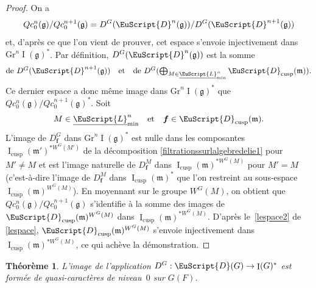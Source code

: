 \documentclass[JEP,XML,SOM,Unicode,francais]{cedram}
\let\mathcal \EuScript
\newcommand{\quadet}{\quad\text{et}\quad}
\newcommand{\frg}{\mathfrak{g}}
\newcommand{\mfrm}{\mathfrak{m}}
\newcommand{\cusp}{\mathrm{cusp}}
\newcommand{\Gr}{\mathrm{Gr}}
\DeclareMathOperator{\rI}{I}
\newcommand{\bmf}{\boldsymbol{f}}
\newcommand{\cD}{\mathcal{D}}
\newcommand{\cL}{\mathcal{L}}
\theoremstyle{plain}
\newtheorem*{thm*}{Théorème}
\theoremstyle{definition}
\begin{document}
\begin{proof}
On a
\[
Qc_{0}^n(\frg)/Qc_{0}^{n+1}(\frg)=D^G(\cD^n(\frg))/D^G(\cD^{n+1}(\frg))
\]
et, d'après ce que l'on vient de prouver, cet espace s'envoie injectivement dans $\Gr^n\rI(\frg)^*$.
Par définition, $D^G(\cD^n(\frg))$ est la somme
\[\textstyle
\text{de }D^G(\cD^{n+1}(\frg))\quadet \text{de }D^G(\bigoplus_{M\in \underline{\cL}_{\min}^n}\cD_{\cusp}(\mfrm)).
\]
Ce dernier espace a donc même image dans $\Gr^n\rI(\frg)^*$ que $Qc_{0}^n(\frg)/Qc_{0}^{n+1}(\frg)^*$. Soit
\[
M\in \underline{\cL}_{\min}^n\quadet \bmf\in \cD_{\cusp}(\mfrm).
\]
L'image de $D^G_{\bmf}$ dans $\Gr^n\rI(\frg)^*$ est nulle dans les composantes $\rI_{\cusp}(\mfrm')^{*W^G(M')}$ de la décomposition \eqref{filtrationssurlalgebredelie1} pour $M'\neq M$ et est l'image naturelle de $D^M_{\bmf}$ dans $\rI_{\cusp}(\mfrm)^{* W^G(M)}$ pour $M'=M$ (c'est-à-dire l'image de $D^M_{\bmf}$ dans $\rI_{\cusp}(\mfrm)^*$ que l'on restreint au sous-espace $\rI_{\cusp}(\mfrm)^{W^G(M)}$). En moyennant sur le groupe $ W^G(M)$, on obtient que $Qc_{0}^n(\frg)/Qc_{0}^{n+1}(\frg)$ s'identifie à la somme des images de $\cD_{\cusp}(\mfrm)^{W^G(M)}$ dans $\rI_{\cusp}(\mfrm)^{*W^G(M)}$.
D'après le~\eqref{lespace2} de \ref{lespace}, $\cD_{\cusp}(\mfrm)^{W^G(M)}$ s'envoie injectivement dans $\rI_{\cusp}(\mfrm)^{*W^G(M)}$, ce qui achève la démonstration.
\end{proof}

\label{unpremiertheoreme}

\begin{thm*}
L'image de l'application $D^G:\cD(G)\to \rI(G)^*$ est formée de quasi-caractères de niveau~$0$ sur $G(F)$.
\end{thm*}
\end{document}

